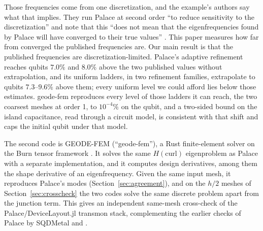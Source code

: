 \documentclass{anvil-paper}
\begin{document}
Those frequencies come from one discretization, and the example's authors
say what that implies. They run Palace at second order ``to reduce
sensitivity to the discretization'' and note that this ``does not mean that
the eigenfrequencies found by Palace will have converged to their true
values'' \citep{devicelayout-example}. This paper measures
how far from converged the published frequencies are. Our
main result is that the published frequencies are discretization-limited.
Palace's adaptive refinement reaches qubits $7.0\%$ and $8.0\%$ above the
two published values without extrapolation, and its uniform ladders, in two
refinement families, extrapolate to qubits $7.3$--$9.6\%$ above them;
every uniform level we could afford lies below those estimates. geode-fem
reproduces every level of those ladders it can reach, the two coarsest
meshes at order 1, to $10^{-4}\%$ on the qubit, and a
two-sided bound on the island capacitance, read through a circuit model, is
consistent with that shift and caps the initial qubit under that model.

The second code is GEODE-FEM (``geode-fem''), a Rust finite-element solver
on the Burn tensor framework \citep{burn}. It solves the same
$H(\mathrm{curl})$ eigenproblem as Palace with a separate implementation,
and it computes design derivatives, among them the shape derivative of an
eigenfrequency. Given the same input mesh, it reproduces Palace's modes
(Section~\ref{sec:agreement}), and on the $h/2$ meshes of
Section~\ref{sec:crosscheck} the two codes solve the same discrete problem
apart from the junction term. This gives an independent
same-mesh cross-check of the Palace/DeviceLayout.jl transmon stack,
complementing the earlier checks of Palace by SQDMetal
\citep{sommers2025open} and \citet{ye2025electromagnetic}.
\end{document}
